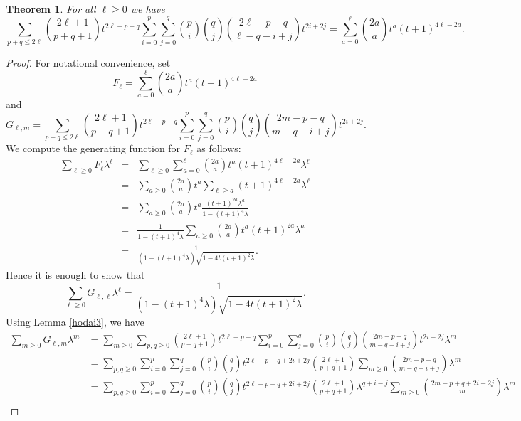 \documentclass{amsart}
\numberwithin{equation}{section}
\theoremstyle{plain}
\newtheorem{thm}{Theorem}[section]
\theoremstyle{definition}
\begin{document}
\begin{thm}\label{thm: f to gamma}
For all $\ell \geq 0$ we have
    \[\sum_{p+q \le 2 \ell} \binom{2 \ell +1}{p+q+1}t^{2\ell -p-q} \sum_{i=0}^p \sum_{j=0}^q  \binom{p}{i} \binom{q}{j}\binom{2\ell -p-q}{\ell -q-i+j} t^{2i + 2j} = \sum_{a=0}^\ell \binom{2a}{a} t^a (t+1)^{4\ell -2a}.
    \]
\end{thm}


\begin{proof}
For notational convenience, set 
\[
F_\ell = \sum_{a=0}^\ell \binom{2a}{a} t^a (t+1)^{4\ell -2a}
\]
and
\[
G_{\ell,m} = 
\sum_{p+q \le 2 \ell} \binom{2 \ell +1}{p+q+1}
t^{2\ell -p-q} \sum_{i=0}^p \sum_{j=0}^q  \binom{p}{i} \binom{q}{j}
\binom{2m -p-q}{m -q-i+j} t^{2i + 2j}.\]
We compute the generating function for $F_{\ell}$ as follows:
\begin{eqnarray*}
\sum_{\ell \ge 0}  F_\ell  \lambda^\ell
&=&\sum_{\ell \ge 0} 
\sum_{a=0}^\ell \binom{2a}{a} t^a (t+1)^{4\ell -2a}
\lambda^\ell\\
&=&
\sum_{a\ge 0} 
\binom{2a}{a} t^a 
\sum_{\ell \ge a} 
(t+1)^{4\ell -2a} 
\lambda^\ell\\
&=&
\sum_{a\ge 0} 
\binom{2a}{a} t^a 
\frac{(t+1)^{2a} \lambda^a}{
1- (t+1)^4 \lambda
}\\
&=&
\frac{1}{
1- (t+1)^4 \lambda
}\sum_{a\ge 0} 
\binom{2a}{a} t^a 
(t+1)^{2a} \lambda^a\\
&=&
\frac{1}{
(1- (t+1)^4 \lambda)\sqrt{
1-4 t (t+1)^2 \lambda
}}.
\end{eqnarray*}
Hence it is enough to show that
\[
\sum_{\ell \ge 0} G_{\ell,\ell} \lambda^\ell
=\frac{1}{
(1- (t+1)^4 \lambda)\sqrt{
1-4 t (t+1)^2 \lambda
}}.
\]
Using Lemma \ref{hodai3}, we have
\[\begin{aligned}
\sum_{m \ge 0} G_{\ell, m} \lambda^m
&=
\sum_{m \ge 0}
\sum_{p, q \ge 0}
\binom{2 \ell +1}{p+q+1}
t^{2\ell -p-q} \sum_{i=0}^p \sum_{j=0}^q  \binom{p}{i} \binom{q}{j}
\binom{2 m -p-q}{m -q-i+j} t^{2i + 2j}
\lambda^m\\
&=
\sum_{p,q \ge 0}
\sum_{i=0}^p \sum_{j=0}^q  
\binom{p}{i} \binom{q}{j}
t^{2\ell -p-q + 2i + 2j}
%
\binom{2 \ell +1}{p+q+1}
%
\sum_{m \ge 0}
\binom{2m -p-q}{m -q-i+j} 
\lambda^m
\\
&=
\sum_{p,q \ge 0}
\sum_{i=0}^p \sum_{j=0}^q  
\binom{p}{i} \binom{q}{j}
t^{2\ell -p-q + 2i + 2j}
%
\binom{2 \ell +1}{p+q+1}
\lambda^{q + i -j}
%
\sum_{m \ge 0}
\binom{2m -p +q + 2i -2j}{m} 
\lambda^{m}
\\

\end{aligned}\]
\end{proof}
\end{document}
